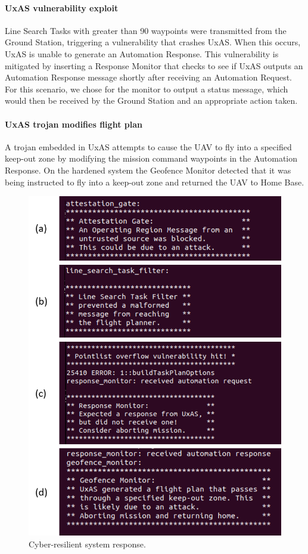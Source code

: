 \paragraph{UxAS vulnerability exploit} Line Search Tasks with greater than 90 waypoints were transmitted from the Ground Station, triggering a vulnerability that crashes UxAS.   When this occurs, UxAS is unable to generate an Automation Response.  
This vulnerability is mitigated by inserting a Response Monitor that checks to see if UxAS outputs an Automation Response message shortly after receiving an Automation Request.  For this scenario, we chose for the monitor to output a status message, which would then be received by the Ground Station and an appropriate action taken.

\paragraph{UxAS trojan modifies flight plan} A trojan embedded in UxAS attempts to cause the UAV to fly into a specified keep-out zone by modifying the mission command waypoints in the Automation Response.  
On the hardened system the Geofence Monitor detected that it was being instructed to fly into a keep-out zone and returned the UAV to Home Base.


\begin{figure}[h]
	\centering
	\includegraphics[width=0.8\columnwidth]{figs/mitigation-output.png}
	\caption{Cyber-resilient system response.} 
	\label{fig:mitigation-output} 
\end{figure}

